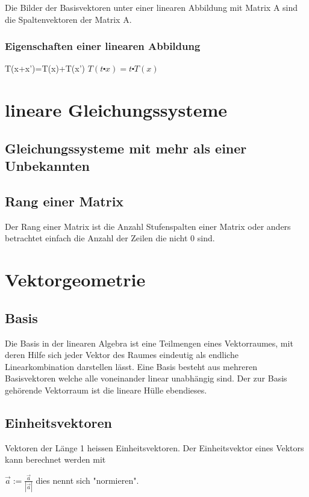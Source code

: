 \documentclass[11pt,a4paper,onecolumn]{article}
\begin{document}
\begin{flushleft}
Die Bilder der Basisvektoren unter einer linearen Abbildung mit Matrix A
sind die Spaltenvektoren der Matrix A.
\subsubsection{Eigenschaften einer linearen Abbildung}
T(x+x')=T(x)+T(x')\linebreak
$T(t\centerdot x) = t \centerdot T(x)$\linebreak



\section{lineare Gleichungssysteme}
\subsection{Gleichungssysteme mit mehr als einer Unbekannten}
\subsection{Rang einer Matrix}
Der Rang einer Matrix ist die Anzahl Stufenspalten einer Matrix oder anders betrachtet einfach die Anzahl der Zeilen die nicht 0 sind.


\section{Vektorgeometrie}

\subsection{Basis}
Die Basis in der linearen Algebra ist eine Teilmengen eines Vektorraumes, mit deren Hilfe sich jeder Vektor des Raumes eindeutig als endliche Linearkombination darstellen lässt. Eine Basis besteht aus mehreren Basisvektoren welche alle voneinander linear unabhängig sind.
Der zur Basis gehörende Vektorraum ist die lineare Hülle ebendieses.

\subsection{Einheitsvektoren}
Vektoren der Länge 1 heissen Einheitsvektoren.\linebreak
Der Einheitsvektor eines Vektors kann berechnet werden mit \linebreak

$\vec{a} := \frac{\vec{a}}{|\vec{a}|}$ dies nennt sich "normieren".


\end{flushleft}
\end{document}
